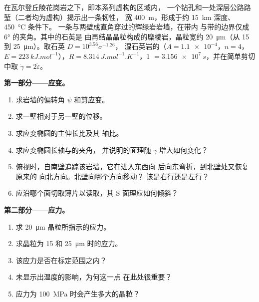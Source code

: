 \begin{problem}
\label{pb:b3:deformation-mechanisms:1}
在瓦尔登丘陵花岗岩之下，即本系列虚构的区域内，
一个钻孔和一处深层公路路堑（二者均为虚构）揭示出一条韧性，
宽 \qty{400}{m}，形成于约 \qty{15}{km} 深度、\qty{450}{\celsius} 条件下。
一条与两壁成直角穿过的辉绿岩岩墙，在带内
与带的边界仅成 \ang{6} 的夹角。其中的石英是
由再结晶晶粒构成的糜棱岩，晶粒宽约 \qty{20}{\micro m}（从 15 到
\qty{25}{\micro m}）。取石英 $D = 10^{3.56}\sigma^{-1.26}$，
湿石英岩的（$A = \num{1.1e-4}$，$n = 4$，$E =
\qty{223}{kJ.mol^{-1}}$），$R = \qty{8.314}{J.mol^{-1}.K^{-1}}$，\qty{1}{} $=
\qty{3.156e7}{s}$，并在简单剪切中取 $\dot\gamma = 2\dot\varepsilon$。

\medskip\noindent\textbf{第一部分——应变。}
\begin{enumerate}
  \item 求岩墙的偏转角 $\psi$ 和剪应变。
  \item 求一壁相对于另一壁的位移。
  \item 求应变椭圆的主伸长比及其
        轴比。
  \item 求应变椭圆长轴与的夹角，
        并说明的面理随 $\gamma$ 增大如何变化？
  \item 俯视时，自南壁追踪该岩墙，它在进入东西向
        后向东弯折，到北壁处又恢复原来的
        向北方向。北壁向哪个方向移动？
        该是右行还是左行？
  \item 应沿哪个面切取薄片以读取，其 S 面理应如何倾斜？
\end{enumerate}

\medskip\noindent\textbf{第二部分——应力。}
\begin{enumerate}[resume]
  \item 求 \qty{20}{\micro m} 晶粒所指示的应力。
  \item 求晶粒为 15 和 \qty{25}{\micro m} 时的应力。
  \item 该应力是否在标定范围之内？
  \item {}未显示出温度的影响，为何这一点
        在此处很重要？
  \item 应力为 \qty{100}{MPa} 时会产生多大的晶粒？
\end{enumerate}


\end{problem}

